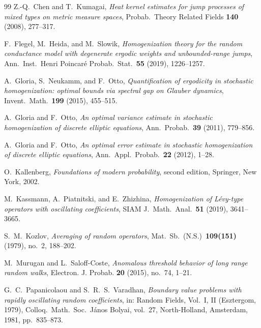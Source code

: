 \documentclass[11pt]{amsart}
\numberwithin{equation}{section}
\begin{document}
\begin{thebibliography}{99}
Z.-Q.~Chen and T.~Kumagai,
\emph{Heat kernel estimates for jump processes of mixed types on metric measure spaces},
Probab.\ Theory Related Fields \textbf{140} (2008), 277--317.

F.~Flegel, M.~Heida, and M.~Slowik,
\emph{Homogenization theory for the random conductance model with degenerate ergodic weights and unbounded-range jumps},
Ann.\ Inst.\ Henri Poincar\'e Probab.\ Stat.\ \textbf{55} (2019), 1226--1257.

A.~Gloria, S.~Neukamm, and F.~Otto,
\emph{Quantification of ergodicity in stochastic homogenization: optimal bounds via spectral gap on Glauber dynamics},
Invent.\ Math.\ \textbf{199} (2015), 455--515.

A.~Gloria and F.~Otto,
\emph{An optimal variance estimate in stochastic homogenization of discrete elliptic equations},
Ann.\ Probab.\ \textbf{39} (2011), 779--856.

A.~Gloria and F.~Otto,
\emph{An optimal error estimate in stochastic homogenization of discrete elliptic equations},
Ann.\ Appl.\ Probab.\ \textbf{22} (2012), 1--28.

O.~Kallenberg,
\emph{Foundations of modern probability}, second edition,
Springer, New York, 2002.

M.~Kassmann, A.~Piatnitski, and E.~Zhizhina,
\emph{Homogenization of L\'evy-type operators with oscillating coefficients},
SIAM J.\ Math.\ Anal.\ \textbf{51} (2019), 3641--3665.

S.~M.~Kozlov,
\emph{Averaging of random operators},
Mat.\ Sb.\ (N.S.)\ \textbf{109(151)} (1979), no.~2, 188--202.

M.~Murugan and L.~Saloff-Coste,
\emph{Anomalous threshold behavior of long range random walks},
Electron. J. Probab. \textbf{20} (2015), no.~74, 1--21.

G.~C.~Papanicolaou and S.~R.~S.~Varadhan,
\emph{Boundary value problems with rapidly oscillating random coefficients},
in: Random Fields, Vol.~I, II (Esztergom, 1979), Colloq.\ Math.\ Soc.\ J\'anos Bolyai, vol.~27, North-Holland, Amsterdam, 1981, pp.~835--873.


\end{thebibliography}
\end{document}
